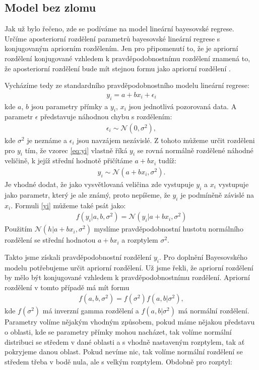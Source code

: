 \documentclass[czech,master,public,dept470,male,cpdeclaration,oneside, python]{diploma}
\begin{document}
\subsection{Model bez zlomu}
Jak už bylo řečeno, zde se podíváme na model lineární bayesovské regrese. Určíme aposteriorní rozdělení parametrů bayesovské lineární regrese s konjugovaným apriorním rozdělením. Jen pro připomenutí to, že je apriorní rozdělení konjugované vzhledem k pravděpodobnostnímu rozdělení znamená to, že aposteriorní rozdělení bude mít stejnou formu jako apriorní rozdělení \cite{robert2007bayesian}. \par
Vycházíme tedy ze standardního pravděpodobnostního modelu lineární regrese: 
\begin{align}
	\label{eq:yi}
	y_i = a + b x_i + \epsilon_i
\end{align}
kde $a$, $b$ jsou parametry přímky a $y_i$, $x_i$ jsou jednotlivá pozorovaná data. A parametr $\epsilon$ představuje náhodnou chybu s rozdělením:
\begin{align*}
	\epsilon_i \sim \mathcal{N}(0, \sigma^2),
\end{align*}
kde $\sigma^2$ je neznáme a $\epsilon_i$ jsou navzájem nezávislé.
Z tohoto můžeme určit rozděleni pro $y_i$ tím, že vzorec \eqref{eq:yi} vlastně říká $y_i$ se rovná normálně rozdělené náhodné veličině, k jejíž střední hodnotě přičítáme $a + bx_i$ tudíž:
\begin{align}\label{yi}
	y_i \sim \mathcal{N}(a + bx_i, \sigma^2).
\end{align}
Je vhodné dodat, že jako vysvětlovaná veličina zde vystupuje $y_i$ a $x_i$ vystupuje jako parametr, který je ale známý, proto nepíšeme, že $y_i$ je podmíněně závislé na $x_i$. Formuli \ref{yi} můžeme také psát jako:
\begin{align}
	f(y_i | a, b, \sigma^2) = \mathcal{N}(y_i | a + bx_i, \sigma^2)
\end{align}
Použitím $\mathcal{N}(h | a + bx_i, \sigma^2)$ myslíme pravděpodobnostní hustotu normálního rozdělení se střední hodnotou $a + bx_i$ a rozptylem $\sigma^2$. \par
Takto jsme získali pravděpodobnostní rozdělení $y_i$. Pro doplnění Bayesovského modelu potřebujeme určit apriorní rozdělení.
Už jsme řekli, že apriorní rozdělení by mělo být konjugované vzhledem k pravděpodobnostnímu rozdělení. Apriorní rozdělení v tomto případě má mít formu
\begin{align}
	f(a, b, \sigma^2) = f(\sigma^2)f(a,b | \sigma^2),
\end{align}
kde $f(\sigma^2)$ má inverzní gamma rozdělení a $f(a,b | \sigma^2)$ má normální rozdělení. Parametry volíme nějakým vhodným způsobem, pokud máme nějakou představu o oblasti, kde se parametry přímky mohou nacházet, tak volíme normální distribuci se středem v dané oblasti a s vhodně nastaveným rozptylem, tak ať pokryjeme danou oblast. Pokud nevíme nic, tak volíme normální rozdělení se středem třeba v bodě nula, ale s velkým rozptylem. Obdobně pro rozptyl:
\end{document}

